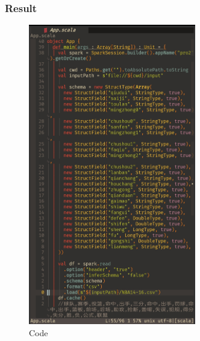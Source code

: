 \documentclass{article}
\begin{document}
\subsubsection{Result}
\begin{figure}[H]
  \begin{center}
    \includegraphics[width=0.65\textwidth]{./figures/4.jpg}
  \end{center}
  \caption{Code}
\end{figure}
\end{document}
